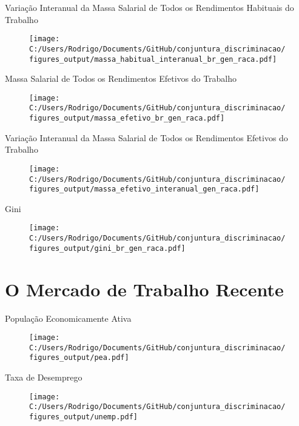 \documentclass[10pt, xcolor=x11names,compress]{beamer}
\begin{document}
	\begin{frame}{Variação Interanual da Massa Salarial de Todos os Rendimentos Habituais do Trabalho}
		\begin{figure}
			\centering
			\texttt{[image: C:/Users/Rodrigo/Documents/GitHub/conjuntura\_discriminacao/figures\_output/massa\_habitual\_interanual\_br\_gen\_raca.pdf]}
		\end{figure}
	\end{frame}
	
	\begin{frame}{Massa Salarial de Todos os Rendimentos Efetivos do Trabalho}
		\begin{figure}
			\centering
			\texttt{[image: C:/Users/Rodrigo/Documents/GitHub/conjuntura\_discriminacao/figures\_output/massa\_efetivo\_br\_gen\_raca.pdf]}
		\end{figure}
	\end{frame}
	
	\begin{frame}{Variação Interanual da Massa Salarial de Todos os Rendimentos Efetivos do Trabalho}
		\begin{figure}
			\centering
			\texttt{[image: C:/Users/Rodrigo/Documents/GitHub/conjuntura\_discriminacao/figures\_output/massa\_efetivo\_interanual\_gen\_raca.pdf]}
		\end{figure}
		\end{frame}
	
	\begin{frame}{Gini}
		\begin{figure}
			\centering
			\texttt{[image: C:/Users/Rodrigo/Documents/GitHub/conjuntura\_discriminacao/figures\_output/gini\_br\_gen\_raca.pdf]}
		\end{figure}
	\end{frame}
	
	\section{O Mercado de Trabalho Recente}
	\begin{frame}{População Economicamente Ativa}
		\begin{figure}
			\centering
			\texttt{[image: C:/Users/Rodrigo/Documents/GitHub/conjuntura\_discriminacao/figures\_output/pea.pdf]}
		\end{figure}
	\end{frame}			
	
	\begin{frame}{Taxa de Desemprego}
		\begin{figure}
			\centering
			\texttt{[image: C:/Users/Rodrigo/Documents/GitHub/conjuntura\_discriminacao/figures\_output/unemp.pdf]}
		\end{figure}
	\end{frame}	
	
\end{document}
